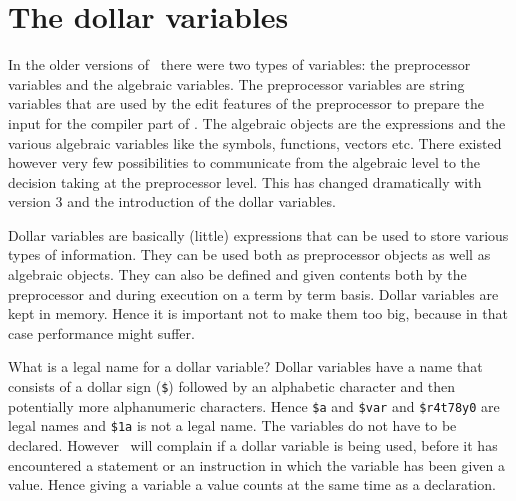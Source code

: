 
\chapter{The dollar variables}
\label{dollars}

In the older versions of \FORM\ there were two types of variables: the 
preprocessor variables and the algebraic 
variables. The preprocessor 
variables are string variables that are used by the edit features of the 
preprocessor to prepare the input for the compiler part of \FORM. The 
algebraic objects are the expressions and the various algebraic variables 
like the symbols, functions, vectors etc. There existed however very few 
possibilities to communicate from the algebraic level to the decision 
taking at the preprocessor level. This has changed dramatically with 
version 3 and the introduction of the dollar 
variables.

Dollar variables are basically (little) expressions that can be used to 
store various types of information. They can be used both as preprocessor 
objects as well as algebraic objects. They can also be defined and given 
contents both by the preprocessor and during execution on a term by term 
basis. Dollar variables are kept in memory. Hence it is important not to 
make them too big, because in that case performance might suffer.

What is a legal name for a dollar variable?
Dollar variables have a name that consists of a dollar sign (\verb:$:) 
followed by an alphabetic character and then potentially more alphanumeric 
characters. Hence \verb:$a: and \verb:$var: and \verb:$r4t78y0: are legal 
names and \verb:$1a: is not a legal name. The variables do not have to be 
declared. However \FORM\ will complain if a dollar variable is being used, 
before it has encountered a statement or an instruction in which the 
variable has been given a value. Hence giving a variable a value counts at 
the same time as a declaration.

